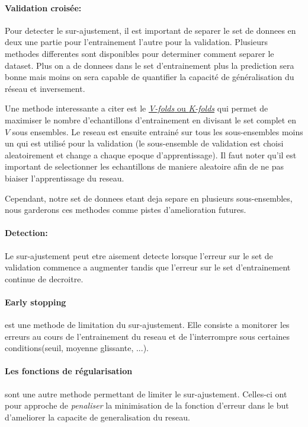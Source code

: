 \documentclass[11pt]{article}
\begin{document}
\paragraph{Validation crois\'ee:} Pour detecter le sur-ajustement, il est
important de separer le set de donnees en deux une partie pour l'entrainement
l'autre pour la validation. Plusieurs methodes differentes sont disponibles
pour determiner comment separer le dataset. Plus on a de donnees dans le set
d'entrainement plus la prediction sera bonne mais moins on sera capable de
quantifier la capacit\'e de g\'en\'eralisation du r\'eseau et inversement.

Une methode interessante a citer est le \href{http://work.caltech.edu/slides/slides13.pdf}
{\emph{V-folds} ou \emph{K-folds}} qui permet de maximiser le nombre d'echantillons
d'entrainement en divisant le set complet en $V$ sous ensembles. Le reseau est
ensuite entrain\'e sur tous les sous-ensembles moins un qui est utilis\'e pour la
validation (le sous-ensemble de validation est choisi aleatoirement et change
a chaque epoque d'apprentissage). Il faut noter qu'il est important de
selectionner les echantillons de maniere aleatoire afin de ne pas biaiser
l'apprentissage du reseau.

Cependant, notre set de donnees etant deja separe en plusieurs sous-ensembles,
nous garderons ces methodes comme pistes d'amelioration futures.

\paragraph{Detection: }Le sur-ajustement peut etre aisement detecte lorsque
l'erreur sur le set de validation commence a augmenter tandis que l'erreur sur
le set d'entrainement continue de decroitre.
\paragraph{Early stopping} est une methode de limitation du sur-ajustement. Elle
consiste a monitorer les erreurs au cours de l'entrainement du reseau et
de l'interrompre sous certaines conditions(seuil, moyenne glissante, ...).

\paragraph{Les fonctions de r\'egularisation} sont une autre methode permettant
de limiter le sur-ajustement. Celles-ci ont pour approche de \emph{penaliser}
la minimisation de la fonction d'erreur dans le but d'ameliorer la capacite de
generalisation du reseau.
\end{document}
